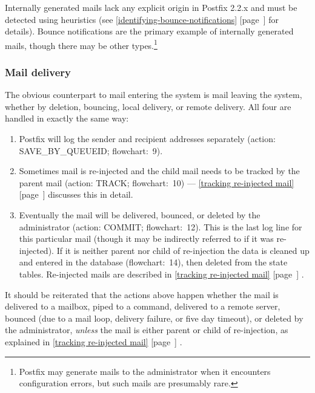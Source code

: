 \documentclass[a4paper,12pt,draft]{article}
\newcommand{\refwithpage}[1]{%
    \empty{}\ref{#1} [page~\pageref{#1}]%
}
\newcommand{\sectionref}[1]{%
    \textsection{}\refwithpage{#1}%
}
\begin{document}
Internally generated mails lack any explicit origin in Postfix 2.2.x and
must be detected using heuristics (see
\sectionref{identifying-bounce-notifications} for details).  Bounce
notifications are the primary example of internally generated mails, though
there may be other types.\footnote{Postfix may generate mails to the
administrator when it encounters configuration errors, but such mails are
presumably rare.}

\subsubsection{Mail delivery}

\label{mail-delivery}

The obvious counterpart to mail entering the system is mail leaving the
system, whether by deletion, bouncing, local delivery, or remote delivery.
All four are handled in exactly the same way:

\begin{enumerate}

    \item Postfix will log the sender and recipient addresses separately
        (action: SAVE\_BY\_QUEUEID\@; flowchart:~9).

    \item Sometimes mail is re-injected and the child mail needs to be
        tracked by the parent mail (action: TRACK\@; flowchart:~10) ---
        \sectionref{tracking re-injected mail} discusses this in
        detail.

    \item Eventually the mail will be delivered, bounced, or deleted by the
        administrator (action: COMMIT\@; flowchart:~12).  This is the last
        log line for this particular mail (though it may be indirectly
        referred to if it was re-injected).  If it is neither parent nor
        child of re-injection the data is cleaned up and entered in the
        database (flowchart:~14), then deleted from the state tables.
        Re-injected mails are described in \sectionref{tracking re-injected
        mail}.

\end{enumerate}

It should be reiterated that the actions above happen whether the mail is
delivered to a mailbox, piped to a command, delivered to a remote server,
bounced (due to a mail loop, delivery failure, or five day timeout), or
deleted by the administrator, \textit{unless\/} the mail is either parent
or child of re-injection, as explained in \sectionref{tracking re-injected
mail}.
\end{document}
